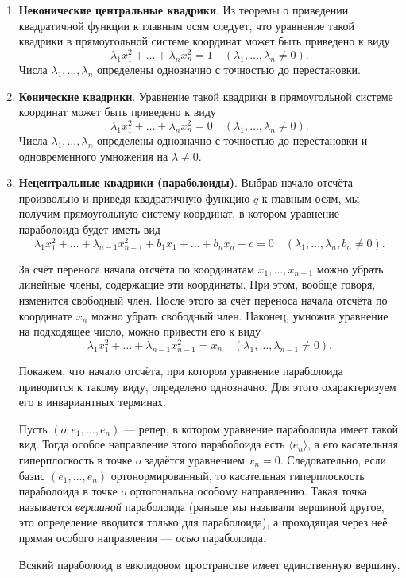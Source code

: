 \begin{enumerate}
    \item \textbf{Неконические центральные квадрики}. Из теоремы о приведении квадратичной функции к главным осям следует, что уравнение такой квадрики в прямоугольной системе координат может быть приведено к виду
        \[
            \lambda_1x_1^2 + \ldots + \lambda_nx_n^2 = 1\quad(\lambda_1, \ldots, \lambda_n \ne 0).
        \]
        Числа $\lambda_1, \ldots, \lambda_n$ определены однозначно с точностью до перестановки.
    \item \textbf{Конические квадрики}. Уравнение такой квадрики в прямоугольной системе координат может быть приведено к виду
        \[
            \lambda_1x_1^2 + \ldots + \lambda_nx_n^2 = 0\quad(\lambda_1, \ldots, \lambda_n \ne 0).
        \]
        Числа $\lambda_1, \ldots, \lambda_n$ определены однозначно с точностью до перестановки и одновременного умножения на $\lambda \ne 0$.
    \item \textbf{Нецентральные квадрики (параболоиды)}. Выбрав начало отсчёта произвольно и приведя квадратичную функцию $q$ к главным осям, мы получим прямоугольную систему координат, в котором уравнение параболоида будет иметь вид
        \[
            \lambda_1x_1^2 + \ldots + \lambda_{n - 1}x_{n - 1}^2 + b_1x_1 + \ldots + b_nx_n + c = 0\quad(\lambda_1, \ldots, \lambda_n, b_n \ne 0).
        \]

        За счёт переноса начала отсчёта по координатам $x_1, \ldots, x_{n - 1}$ можно убрать линейные члены, содержащие эти координаты. При этом, вообще говоря, изменится свободный член. После этого за счёт переноса начала отсчёта по координате $x_n$ можно убрать свободный член. Наконец, умножив уравнение на подходящее число, можно привести его к виду
        \[
            \lambda_1x_1^2 + \ldots + \lambda_{n - 1}x_{n - 1}^2 = x_n\quad(\lambda_1, \ldots, \lambda_{n - 1} \ne 0).
        \]
        
        Покажем, что начало отсчёта, при котором уравнение параболоида приводится к такому виду, определено однозначно. Для этого охарактеризуем его в инвариантных терминах.

        Пусть $(o; e_1, \ldots, e_n)$ --- репер, в котором уравнение параболоида имеет такой вид. Тогда особое направление этого парабобоида есть $\langle e_n\rangle$, а его касательная гиперплоскость в точке $o$ задаётся уравнением $x_n = 0$. Следовательно, если базис $(e_1, \ldots, e_n)$ ортонормированный, то касательная гиперплоскость параболоида в точке $o$ ортогональна особому направлению. Такая точка называется \textit{вершиной} параболоида (раньше мы называли вершиной другое, это определение вводится только для параболоида), а проходящая через неё прямая особого направления --- \textit{осью} параболоида.
        \begin{proposal}
            Всякий параболоид в евклидовом пространстве имеет единственную вершину.
        \end{proposal}


\end{enumerate}
